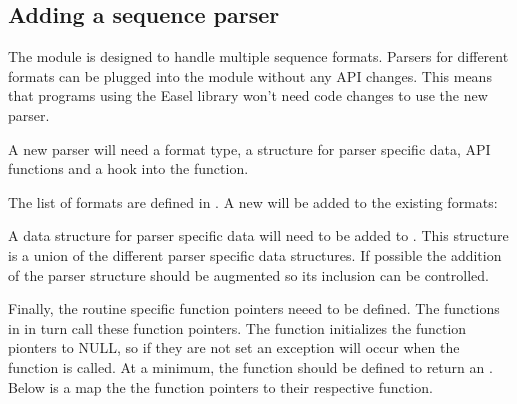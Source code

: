 \subsection{Adding a sequence parser}

The  module is designed to handle multiple sequence
formats.  Parsers for different formats can be plugged into the
 module without any API changes.  This means that
programs using the Easel library won't need code changes to
use the new parser.

A new parser will need a format type, a structure for parser
specific data, API functions and a hook into the 
 function.

The list of formats are defined in .  A new
 will be added to the existing formats:



A data structure for parser specific data will need to be added
to .  This structure is a union of the 
different parser specific data structures.  If possible the
addition of the parser structure should be augmented so its
inclusion can be controlled.



Finally, the routine specific function pointers neeed to be
defined.  The functions in  in turn call
these function pointers.  The  function
initializes the function pionters to NULL, so if they are not
set an exception will occur when the function is called.  At
a minimum, the function should be defined to return an
.  Below is a map the the function
pointers to their respective function.

